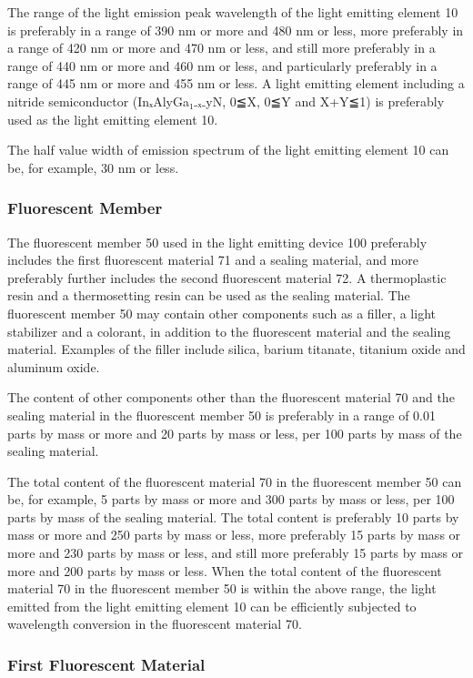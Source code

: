 \documentclass[11pt,a4paper]{article}
\begin{document}
The range of the light emission peak wavelength of the light emitting element 10 is preferably in a range of 390 nm or more and 480 nm or less, more preferably in a range of 420 nm or more and 470 nm or less, and still more preferably in a range of 440 nm or more and 460 nm or less, and particularly preferably in a range of 445 nm or more and 455 nm or less. A light emitting element including a nitride semiconductor (InₓAlyGa₁₋ₓ₋yN, 0≦X, 0≦Y and X+Y≦1) is preferably used as the light emitting element 10.

The half value width of emission spectrum of the light emitting element 10 can be, for example, 30 nm or less.

\subsubsection{Fluorescent Member}

The fluorescent member 50 used in the light emitting device 100 preferably includes the first fluorescent material 71 and a sealing material, and more preferably further includes the second fluorescent material 72. A thermoplastic resin and a thermosetting resin can be used as the sealing material. The fluorescent member 50 may contain other components such as a filler, a light stabilizer and a colorant, in addition to the fluorescent material and the sealing material. Examples of the filler include silica, barium titanate, titanium oxide and aluminum oxide.

The content of other components other than the fluorescent material 70 and the sealing material in the fluorescent member 50 is preferably in a range of 0.01 parts by mass or more and 20 parts by mass or less, per 100 parts by mass of the sealing material.

The total content of the fluorescent material 70 in the fluorescent member 50 can be, for example, 5 parts by mass or more and 300 parts by mass or less, per 100 parts by mass of the sealing material. The total content is preferably 10 parts by mass or more and 250 parts by mass or less, more preferably 15 parts by mass or more and 230 parts by mass or less, and still more preferably 15 parts by mass or more and 200 parts by mass or less. When the total content of the fluorescent material 70 in the fluorescent member 50 is within the above range, the light emitted from the light emitting element 10 can be efficiently subjected to wavelength conversion in the fluorescent material 70.

\subsubsection{First Fluorescent Material}
\end{document}
